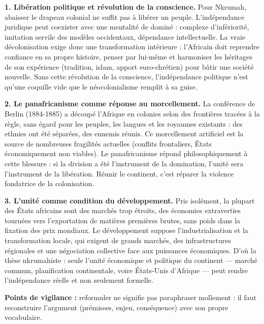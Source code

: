\documentclass[11pt]{article}
\begin{document}
\begin{corrige}

\textbf{1. Libération politique et révolution de la conscience.} Pour Nkrumah, abaisser le drapeau colonial ne suffit pas à libérer un peuple. L'indépendance juridique peut coexister avec une mentalité de dominé : complexe d'infériorité, imitation servile des modèles occidentaux, dépendance intellectuelle. La vraie décolonisation exige donc une transformation intérieure : l'Africain doit reprendre confiance en sa propre histoire, penser par lui-même et harmoniser les héritages de son expérience (tradition, islam, apport euro-chrétien) pour bâtir une société nouvelle. Sans cette révolution de la conscience, l'indépendance politique n'est qu'une coquille vide que le néocolonialisme remplit à sa guise.

\textbf{2. Le panafricanisme comme réponse au morcellement.} La conférence de Berlin (1884-1885) a découpé l'Afrique en colonies selon des frontières tracées à la règle, sans égard pour les peuples, les langues et les royaumes existants : des ethnies ont été séparées, des ennemis réunis. Ce morcellement artificiel est la source de nombreuses fragilités actuelles (conflits frontaliers, États économiquement non viables). Le panafricanisme répond philosophiquement à cette blessure : si la division a été l'instrument de la domination, l'unité sera l'instrument de la libération. Réunir le continent, c'est réparer la violence fondatrice de la colonisation.

\textbf{3. L'unité comme condition du développement.} Pris isolément, la plupart des États africains sont des marchés trop étroits, des économies extraverties tournées vers l'exportation de matières premières brutes, sans poids dans la fixation des prix mondiaux. Le développement suppose l'industrialisation et la transformation locale, qui exigent de grands marchés, des infrastructures régionales et une négociation collective face aux puissances économiques. D'où la thèse nkrumahiste : seule l'unité économique et politique du continent — marché commun, planification continentale, voire États-Unis d'Afrique — peut rendre l'indépendance réelle et non seulement formelle.

\textbf{Points de vigilance :} reformuler ne signifie pas paraphraser mollement : il faut reconstruire l'argument (prémisses, enjeu, conséquence) avec son propre vocabulaire.
\end{corrige}
\end{document}
